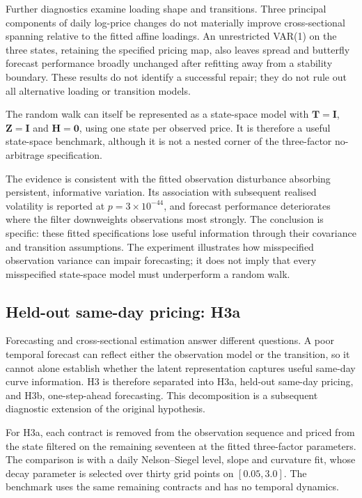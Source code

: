 \documentclass[journal]{IEEEtran}
\begin{document}
Further diagnostics examine loading shape and transitions. Three principal components of daily log-price changes do not materially improve cross-sectional spanning relative to the fitted affine loadings. An unrestricted VAR(1) on the three states, retaining the specified pricing map, also leaves spread and butterfly forecast performance broadly unchanged after refitting away from a stability boundary. These results do not identify a successful repair; they do not rule out all alternative loading or transition models.

The random walk can itself be represented as a state-space model with $\bm{T}=\bm{I}$, $\bm{Z}=\bm{I}$ and $\bm{H}=\bm{0}$, using one state per observed price. It is therefore a useful state-space benchmark, although it is not a nested corner of the three-factor no-arbitrage specification.

The evidence is consistent with the fitted observation disturbance absorbing persistent, informative variation. Its association with subsequent realised volatility is reported at $p=3\times10^{-44}$, and forecast performance deteriorates where the filter downweights observations most strongly. The conclusion is specific: these fitted specifications lose useful information through their covariance and transition assumptions. The experiment illustrates how misspecified observation variance can impair forecasting; it does not imply that every misspecified state-space model must underperform a random walk.

\subsection{Held-out same-day pricing: H3a}
\label{sec:h3a}

Forecasting and cross-sectional estimation answer different questions. A poor temporal forecast can reflect either the observation model or the transition, so it cannot alone establish whether the latent representation captures useful same-day curve information. H3 is therefore separated into H3a, held-out same-day pricing, and H3b, one-step-ahead forecasting. This decomposition is a subsequent diagnostic extension of the original hypothesis.

For H3a, each contract is removed from the observation sequence and priced from the state filtered on the remaining seventeen at the fitted three-factor parameters. The comparison is with a daily Nelson--Siegel level, slope and curvature fit, whose decay parameter is selected over thirty grid points on $[0.05,3.0]$. The benchmark uses the same remaining contracts and has no temporal dynamics.
\end{document}
